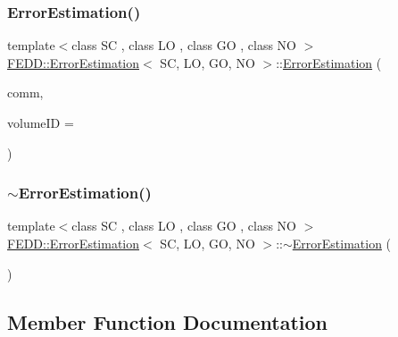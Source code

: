 \mbox{\label{classFEDD_1_1ErrorEstimation_a070e1764ce11ff85ddac0b00f2f3c638}} 
\subsubsection{\texorpdfstring{Error\+Estimation()}{ErrorEstimation()}\hspace{0.1cm}{\footnotesize\ttfamily [2/2]}}
{\footnotesize\ttfamily template$<$class SC , class LO , class GO , class NO $>$ \\
\hyperlink{classFEDD_1_1ErrorEstimation}{F\+E\+D\+D\+::\+Error\+Estimation}$<$ SC, LO, GO, NO $>$\+::\hyperlink{classFEDD_1_1ErrorEstimation}{Error\+Estimation} (\begin{DoxyParamCaption}\item[{\hyperlink{classFEDD_1_1ErrorEstimation_a23c88f794d901561ef57840b68c0aa20}{Comm\+Const\+Ptr\+\_\+\+Type}}]{comm,  }\item[{int}]{volume\+ID = {} }\end{DoxyParamCaption})}

\mbox{\label{classFEDD_1_1ErrorEstimation_a98bcec4b2275c1f1a32607f9b427e884}} 
\subsubsection{\texorpdfstring{$\sim$\+Error\+Estimation()}{~ErrorEstimation()}}
{\footnotesize\ttfamily template$<$class SC , class LO , class GO , class NO $>$ \\
\hyperlink{classFEDD_1_1ErrorEstimation}{F\+E\+D\+D\+::\+Error\+Estimation}$<$ SC, LO, GO, NO $>$\+::$\sim$\hyperlink{classFEDD_1_1ErrorEstimation}{Error\+Estimation} (\begin{DoxyParamCaption}{ }\end{DoxyParamCaption})}



\subsection{Member Function Documentation}
\mbox{\label{classFEDD_1_1ErrorEstimation_a83f3191de2d2aa74ad72ddd5e5fab104}} 
